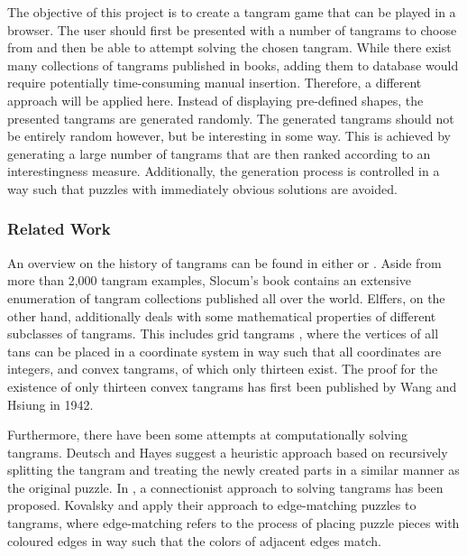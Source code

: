 The objective of this project is to create a tangram game that can be played in a browser. The user should first be presented with a number of tangrams to choose from and then be able to attempt solving the chosen tangram. 
While there exist many collections of tangrams published in books, adding them to database would require potentially time-consuming manual insertion. Therefore, a different approach will be applied here. Instead of displaying pre-defined shapes, the presented tangrams are generated randomly. The generated tangrams should not be entirely random however, but be interesting in some way. This is achieved by generating a large number of tangrams that are then ranked according to an interestingness measure. Additionally, the generation process is controlled in a way such that puzzles with immediately obvious solutions are avoided. 

\subsubsection*{Related Work}

An overview on the history of tangrams can be found in either \cite{slocum03} or \cite{elffers76}. Aside from more than 2,000 tangram examples, Slocum's book contains an extensive enumeration of tangram collections published all over the world. Elffers, on the other hand, additionally deals with some mathematical properties of different subclasses of tangrams. This includes grid tangrams \cite{koeller99}, where the vertices of all tans can be placed in a coordinate system in way such that all coordinates are integers, and convex tangrams, of which only thirteen exist. The proof for the existence of only thirteen convex tangrams has first been published by Wang and Hsiung \cite{wang42} in 1942.

Furthermore, there have been some attempts at computationally solving tangrams. Deutsch and Hayes \cite{deutsch72} suggest a heuristic approach based on recursively splitting the tangram and treating the newly created parts in a similar manner as the original puzzle. In \cite{oflazer93}, a connectionist approach to solving tangrams has been proposed. Kovalsky and \cite{kovalsky14} apply their approach to edge-matching puzzles to tangrams, where edge-matching refers to the process of placing puzzle pieces with coloured edges in way such that the colors of adjacent edges match.

